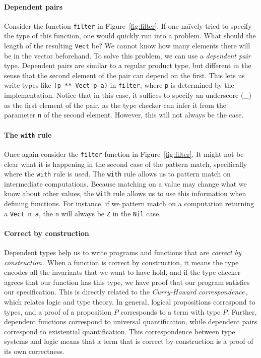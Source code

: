 \paragraph{Dependent pairs} Consider the function \texttt{filter} in Figure~\ref{fig:filter}. If one na\"{i}vely tried to specify the type of this function, one would quickly run into a problem. What should the length of the resulting \texttt{Vect} be? We cannot know how many elements there will be in the vector beforehand. To solve this problem, we can use a \emph{dependent pair} type. Dependent pairs are similar to a regular product type, but different in the sense that the second element of the pair can depend on the first. This lets us write types like \texttt{(p ** Vect p a)} in \texttt{filter}, where \texttt{p} is determined by the implementation. Notice that in this case, it suffices to specify an underscore (\_) as the first element of the pair, as the type checker can infer it from the parameter \texttt{n} of the second element. However, this will not always be the case.

\paragraph{The \texttt{with} rule} Once again consider the \texttt{filter} function in Figure~\ref{fig:filter}. It might not be clear what it is happening in the second case of the pattern match, specifically where the \texttt{with} rule is used. The \texttt{with} rule allows us to pattern match on intermediate computations. Because matching on a value may change what we know about other values, the \texttt{with} rule allows us to use this information when defining functions. For instance, if we pattern match on a computation returning a \texttt{Vect n a}, the \texttt{n} will always be \texttt{Z} in the \texttt{Nil} case.
 
\paragraph{Correct by construction} Dependent types help us to write programs and functions that are \emph{correct by construction}\,\cite[p. 464]{Pierce:TypeSystems}. When a function is correct by construction, it means the type encodes all the invariants that we want to have hold, and if the type checker agrees that our function has this type, we have proof that our program satisfies our specification. This is directly related to the \emph{Curry-Howard correspondence}\,\cite[pp. 108]{Pierce:TypeSystems}, which relates logic and type theory. In general, logical propositions correspond to types, and a proof of a proposition $P$ corresponds to a term with type $P$. Further, dependent functions correspond to universal quantification, while dependent pairs correspond to existential quantification. This correspondence between type systems and logic means that a term that is correct by construction is a proof of its own correctness.

